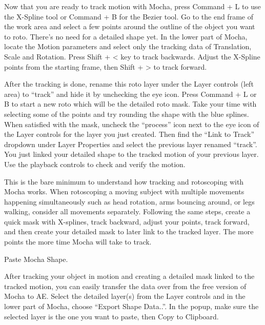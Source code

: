 \begin{fullwidth}

Now that you are ready to track motion with Mocha, press Command + L to use the X-Spline tool or Command + B for the Bezier tool. Go to the end frame of the work area and select a few points around the outline of the object you want to roto. There’s no need for a detailed shape yet. In the lower part of Mocha, locate the Motion parameters and select only the tracking data of Translation, Scale and Rotation. Press Shift + < key to track backwards. Adjust the X-Spline points from the starting frame, then Shift + > to track forward.



After the tracking is done, rename this roto layer under the Layer controls (left area) to “track” and hide it by unchecking the eye icon. Press Command + L or B to start a new roto which will be the detailed roto mask. Take your time with selecting some of the points and try rounding the shape with the blue splines. When satisfied with the mask, uncheck the “process” icon next to the eye icon of the Layer controls for the layer you just created. Then find the “Link to Track” dropdown under Layer Properties and select the previous layer renamed “track”. You just linked your detailed shape to the tracked motion of your previous layer. Use the playback controls to check and verify the motion.
\clearpage
{}

This is the bare minimum to understand how tracking and rotoscoping with Mocha works. When rotoscoping a moving subject with multiple movements happening simultaneously such as head rotation, arms bouncing around, or legs walking, consider all movements separately. Following the same steps, create a quick mask with X-splines, track backward, adjust your points, track forward, and then create your detailed mask to later link to the tracked layer. The more points the more time Mocha will take to track.


{\large Paste Mocha Shape. \par}

After tracking your object in motion and creating a detailed mask linked to the tracked motion, you can easily transfer the data over from the free version of Mocha to AE. Select the detailed layer(s) from the Layer controls and in the lower part of Mocha, choose “Export Shape Data..”. In the popup, make sure the selected layer is the one you want to paste, then Copy to Clipboard.


\end{fullwidth}
